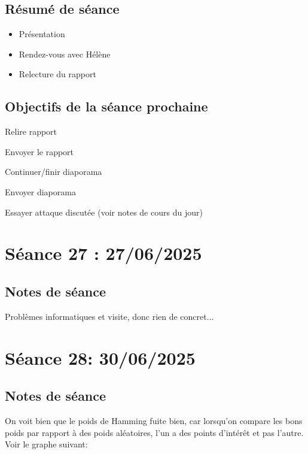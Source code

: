 \documentclass[12pt]{article}
\newcommand{\cmark}{\ding{51}}%
\newcommand{\done}{\rlap{$\square$}{\raisebox{2pt}{\large\hspace{1pt}\cmark}}%
	\hspace{-2.5pt}}
\begin{document}
	\subsection{Résumé de séance}
	\begin{itemize}
		\item Présentation
		\item Rendez-vous avec Hélène
		\item Relecture du rapport
	\end{itemize}
	
	\subsection{Objectifs de la séance prochaine}
	\begin{todolist}
		\item[\done] Relire rapport
		\item[\done] Envoyer le rapport
		\item[\done] Continuer/finir diaporama
		\item[\done] Envoyer diaporama
		\item[\done] Essayer attaque discutée (voir notes de cours du jour)
	\end{todolist}
	
	
	\section{Séance 27 : 27/06/2025}
	\subsection{Notes de séance}
	Problèmes informatiques et visite, donc rien de concret...
	
	\section{Séance 28: 30/06/2025}
	\subsection{Notes de séance}
	On voit bien que le poids de Hamming fuite bien, car lorsqu'on compare les bons poids par rapport à des poids aléatoires, l'un a des points d'intérêt et pas l'autre. Voir le graphe suivant:
	
\end{document}
